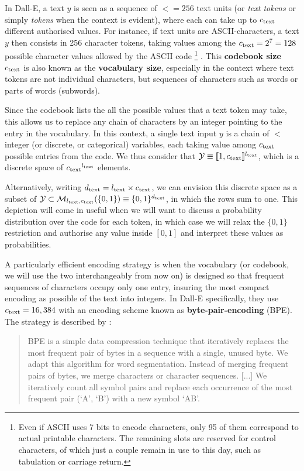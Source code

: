 \documentclass{article}
\begin{document}
\begin{appendix}
In Dall-E, a text $y$ is seen as a sequence of $\lt=256$ text units (or \emph{text tokens} or simply \emph{tokens} when the context is evident), where each can take up to ${c_{\mathrm{text}}}$ different authorised values.
For instance, if text units are ASCII-characters, a text $y$ then consists in 256 character tokens, taking values among the ${c_{\mathrm{text}}}=2^7=128$ possible character values allowed by the ASCII code
    \footnote{
    Even if ASCII uses 7 bits to encode characters, only 95 of them correspond to actual printable characters.
    The remaining slots are reserved for control characters, of which just a couple remain in use to this day, such as tabulation or carriage return.
    }
.
This \textbf{codebook size} ${c_{\mathrm{text}}}$ is also known as the \textbf{vocabulary size}, especially in the context where text tokens are not individual characters, but sequences of characters such as words or parts of words (subwords).

Since the codebook lists the all the possible values that a text token may take, this allows us to replace any chain of characters by an integer pointing to the entry in the vocabulary. 
In this context, a single text input $y$ is a chain of $\lt$ integer (or discrete, or categorical) variables, each taking value among ${c_{\mathrm{text}}}$ possible entries from the code.
We thus consider that $\mathcal{Y}\equiv [\![1,{c_{\mathrm{text}}} ]\!]^{{l_{\mathrm{text}}}}$, which is a discrete space of ${c_{\mathrm{text}}}^{l_{\mathrm{text}}}$ elements. 

Alternatively, writing ${d_{\mathrm{text}}} = {l_{\mathrm{text}}} \times {c_{\mathrm{text}}}$, we can envision this discrete space as a subset of $\mathcal{Y} \subset \mathcal{M}_{{l_{\mathrm{text}}},{c_{\mathrm{text}}}}(\{0,1\})\equiv \{0,1\}^{d_{\mathrm{text}}}$, in which the rows sum to one.
This depiction will come in useful when we will want to discuss a probability distribution over the code for each token, in which case we will relax the $\{0,1\}$ restriction and authorise any value inside $[0,1]$ and interpret these values as probabilities.

A particularly efficient encoding strategy is when the vocabulary (or codebook, we will use the two interchangeably from now on) is designed so that frequent sequences of characters occupy only one entry, insuring the most compact encoding as possible of the text into integers.
In Dall-E specifically, they use ${c_{\mathrm{text}}}=16,384$ with an encoding scheme known as \textbf{byte-pair-encoding} (BPE). The strategy is described by \citep{bperef}:

\blockquote{
BPE is a simple data compression technique that iteratively replaces the most frequent pair of bytes in a sequence with a single, unused byte.
We adapt this algorithm for word segmentation.
Instead of merging frequent pairs of bytes, we merge characters or character sequences.
[...]
We iteratively count all symbol pairs and replace each occurrence of the most frequent pair (‘A’, ‘B’) with a new symbol ‘AB’.
}


\end{appendix}
\end{document}
